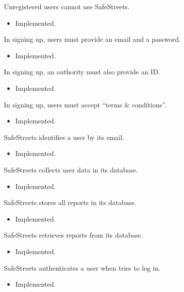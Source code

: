 \documentclass[../ITD.tex]{subfiles}
\begin{document}
    \begin{enumerate}
         Unregistered users cannot use SafeStreets.
        \begin{itemize}
            \item Implemented.
        \end{itemize}

         In signing up, users must provide an email and a password.
        \begin{itemize}
            \item Implemented.
        \end{itemize}

         In signing up, an authority must also provide an ID\@.
        \begin{itemize}
            \item Implemented.
        \end{itemize}

         In signing up, users must accept “terms \& conditions”.
        \begin{itemize}
            \item Implemented.
        \end{itemize}

         SafeStreets identifies a user by its email.
        \begin{itemize}
            \item Implemented.
        \end{itemize}

         SafeStreets collects user data in its database.
        \begin{itemize}
            \item Implemented.
        \end{itemize}

         SafeStreets stores all reports in its database.
        \begin{itemize}
            \item Implemented.
        \end{itemize}

         SafeStreets retrieves reports from its database.
        \begin{itemize}
            \item Implemented.
        \end{itemize}

         SafeStreets authenticates a user when tries to log in.
        \begin{itemize}
            \item Implemented.
        \end{itemize}


\end{enumerate}
\end{document}

